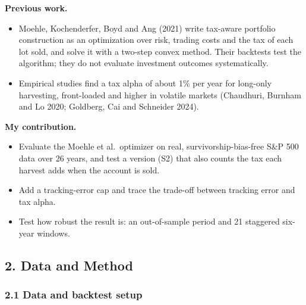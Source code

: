 \documentclass[
  11pt,
]{article}
\providecommand{\tightlist}{%
  \setlength{\itemsep}{0pt}\setlength{\parskip}{0pt}}
\begin{document}
\textbf{Previous work.}

\begin{itemize}
\tightlist
\item
  Moehle, Kochenderfer, Boyd and Ang (2021) write tax-aware portfolio construction as an optimization over risk, trading costs and the tax of each lot sold, and solve it with a two-step convex method. Their backtests test the algorithm; they do not
  evaluate investment outcomes systematically.
\item
  Empirical studies find a tax alpha of about 1\% per year for long-only harvesting, front-loaded and higher in volatile markets (Chaudhuri, Burnham and Lo 2020; Goldberg, Cai and Schneider 2024).
\end{itemize}

\textbf{My contribution.}

\begin{itemize}
\tightlist
\item
  Evaluate the Moehle et al.~optimizer on real, survivorship-bias-free S\&P 500 data over 26 years, and test a version (S2) that also counts the tax each harvest adds when the account is sold.
\item
  Add a tracking-error cap and trace the trade-off between tracking error and tax alpha.
\item
  Test how robust the result is: an out-of-sample period and 21 staggered six-year windows.
\end{itemize}

\hypertarget{data-and-method}{%
\subsection{2. Data and Method}\label{data-and-method}}

\hypertarget{data-and-backtest-setup}{%
\subsubsection{2.1 Data and backtest setup}\label{data-and-backtest-setup}}
\end{document}
